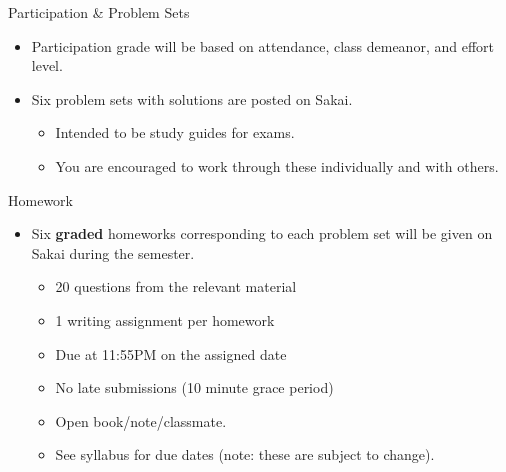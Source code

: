 \documentclass[xcolor={dvipsnames},pdf, hyperref={colorlinks=true, citecolor=ForestGreen, linkcolor=BlueViolet, urlcolor=Magenta}]{beamer}
\begin{document}
	\begin{frame}{Participation \& Problem Sets}
		\begin{itemize}
			\item Participation grade will be based on attendance, class demeanor, and effort level.
			\item Six problem sets with solutions are posted on Sakai.
			\begin{itemize}
				\item Intended to be study guides for exams.
				\item You are encouraged to work through these individually and with others.
			\end{itemize}
		\end{itemize}
	\end{frame}


	\begin{frame}{Homework}
	\begin{itemize}
			\item Six \textbf{graded} homeworks corresponding to each problem set will be given on Sakai during the semester.
		\begin{itemize}
			\item 20 questions from the relevant material
			\item 1 writing assignment per homework 
			\item Due at 11:55PM on the assigned date
			\item No late submissions (10 minute grace period)
			\item Open book/note/classmate.
			\item See syllabus for due dates (note: these are subject to change).
		\end{itemize}
	\end{itemize}
	\end{frame}
	
\end{document}
